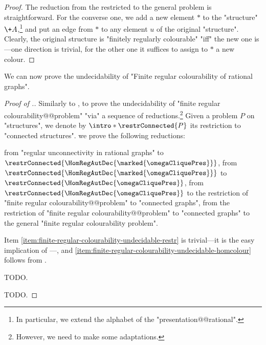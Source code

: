 \begin{proof}
	The reduction from the restricted to the general problem is straightforward.
	For the converse one, we add a new element $*$ to the "structure" $\+A$,\footnote{In particular, we extend the alphabet of the "presentation@@rational".} and put an edge
	from $*$ to any element $u$ of the original "structure". 
	Clearly, the original structure is "finitely regularly colourable" "iff" the new one is---one direction is trivial, for the other one it suffices to assign to $*$ a new colour.
\end{proof}

We can now prove the undecidability of "Finite regular colourability of rational graphs".

\begin{proof}[Proof of .]
	Similarly to ,
	to prove the undecidability of "finite regular colourability@@problem"
	"via" a sequence of reductions.\footnote{However, we need to make some adaptations.}
	Given a problem $P$ on "structures", we denote by \AP$\intro*\restrConnected{P}$
	its restriction to "connected structures".
	we prove the following reductions:
	\begin{enumerate}
		\itemAP\label{item:finite-regular-colourability-undecidable-link}%
			from "regular unconnectivity in rational graphs"
			to $\restrConnected{\HomRegAutDec{\marked{\omegaCliquePres}}}$,
		\itemAP\label{item:finite-regular-colourability-undecidable-icore}%
			from $\restrConnected{\HomRegAutDec{\marked{\omegaCliquePres}}}$
			to $\restrConnected{\HomRegAutDec{\omegaCliquePres}}$,
		\itemAP\label{item:finite-regular-colourability-undecidable-homcolour}%
			from $\restrConnected{\HomRegAutDec{\omegaCliquePres}}$ to 
			the restriction of "finite regular colourability@@problem" to "connected graphs",
		\itemAP\label{item:finite-regular-colourability-undecidable-restr}%
			from the restriction of "finite regular colourability@@problem" to "connected graphs"
			to the general "finite regular colourability problem".
	\end{enumerate}
	Item \eqref{item:finite-regular-colourability-undecidable-restr} is
	trivial---it is the easy implication of
	---, and
	\eqref{item:finite-regular-colourability-undecidable-homcolour} 
	follows from .

	TODO.
	
	TODO.
\end{proof}
